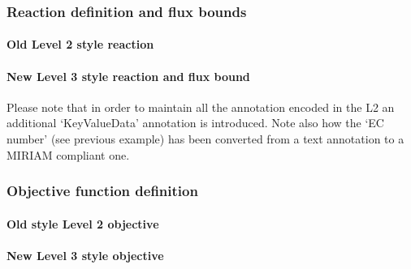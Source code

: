 \subsubsection*{Reaction definition and flux bounds}
\paragraph{Old \SBML Level 2 style reaction}
\newpage
\paragraph{New \SBML Level 3 style reaction and flux bound}
Please note that in order to maintain all the annotation encoded in the \SBML L2 \Reaction {} an additional `KeyValueData' annotation is introduced. Note also how the `EC number' (see previous example) has been converted from a text annotation to a {MIRIAM} compliant one.


\subsubsection*{Objective function definition}
\paragraph{Old style \SBML Level 2 objective}
\newpage
\paragraph{New \SBML Level 3 style objective}
\protect{}


